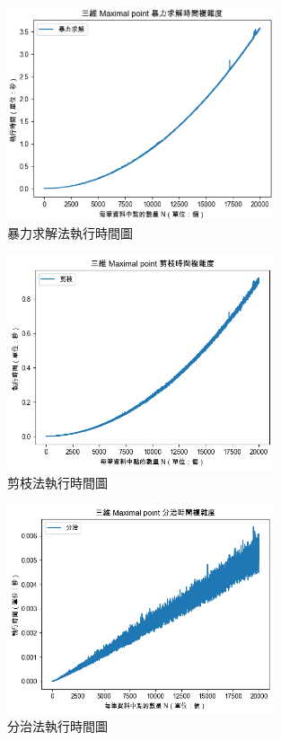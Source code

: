 \documentclass[12pt]{article}
\begin{document}
\begin{figure}[H]
	\centering
	\includegraphics[width=0.7\textwidth]{bruteforce}
	\caption{暴力求解法執行時間圖} %
	\label{Fig.main2} %
\end{figure}
\begin{figure}[H]
	\centering
	\includegraphics[width=0.7\textwidth]{pruning}
	\caption{剪枝法執行時間圖} %
	\label{Fig.main3} %
\end{figure}
\begin{figure}[H]
	\centering
	\includegraphics[width=0.7\textwidth]{linear}
	\caption{分治法執行時間圖} %
	\label{Fig.main4} %
\end{figure}
\end{document}
